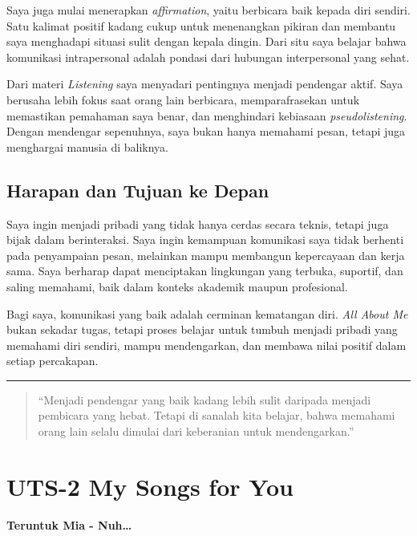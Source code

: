 \documentclass[
  letterpaper,
  DIV=11,
  numbers=noendperiod]{scrreprt}
\begin{document}
Saya juga mulai menerapkan \emph{affirmation}, yaitu berbicara baik
kepada diri sendiri. Satu kalimat positif kadang cukup untuk menenangkan
pikiran dan membantu saya menghadapi situasi sulit dengan kepala dingin.
Dari situ saya belajar bahwa komunikasi intrapersonal adalah pondasi
dari hubungan interpersonal yang sehat.

Dari materi \emph{Listening} saya menyadari pentingnya menjadi pendengar
aktif. Saya berusaha lebih fokus saat orang lain berbicara,
memparafrasekan untuk memastikan pemahaman saya benar, dan menghindari
kebiasaan \emph{pseudolistening}. Dengan mendengar sepenuhnya, saya
bukan hanya memahami pesan, tetapi juga menghargai manusia di baliknya.

\section{Harapan dan Tujuan ke Depan}\label{harapan-dan-tujuan-ke-depan}

Saya ingin menjadi pribadi yang tidak hanya cerdas secara teknis, tetapi
juga bijak dalam berinteraksi. Saya ingin kemampuan komunikasi saya
tidak berhenti pada penyampaian pesan, melainkan mampu membangun
kepercayaan dan kerja sama. Saya berharap dapat menciptakan lingkungan
yang terbuka, suportif, dan saling memahami, baik dalam konteks akademik
maupun profesional.

Bagi saya, komunikasi yang baik adalah cerminan kematangan diri.
\emph{All About Me} bukan sekadar tugas, tetapi proses belajar untuk
tumbuh menjadi pribadi yang memahami diri sendiri, mampu mendengarkan,
dan membawa nilai positif dalam setiap percakapan.

\begin{center}\rule{0.5\linewidth}{0.5pt}\end{center}

\begin{quote}
``Menjadi pendengar yang baik kadang lebih sulit daripada menjadi
pembicara yang hebat. Tetapi di sanalah kita belajar, bahwa memahami
orang lain selalu dimulai dari keberanian untuk mendengarkan.''
\end{quote}


\chapter{UTS-2 My Songs for You}\label{uts-2-my-songs-for-you}

\textbf{Teruntuk Mia - Nuh\ldots{}}
\end{document}
